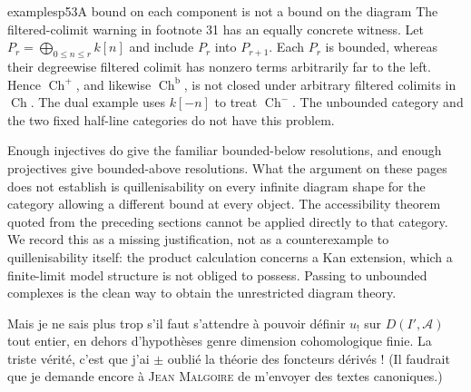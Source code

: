\begin{dcomment}{examples}{p53}{A bound on each component is not a bound on the diagram}
The filtered-colimit warning in footnote 31 has an equally concrete witness. Let $P_r=\bigoplus_{0\leq n\leq r}k[n]$ and include $P_r$ into $P_{r+1}$. Each $P_r$ is bounded, whereas their degreewise filtered colimit has nonzero terms arbitrarily far to the left. Hence $\operatorname{Ch}^+$, and likewise $\operatorname{Ch}^{\mathrm b}$, is not closed under arbitrary filtered colimits in $\operatorname{Ch}$. The dual example uses $k[-n]$ to treat $\operatorname{Ch}^-$. The unbounded category and the two fixed half-line categories do not have this problem.

Enough injectives do give the familiar bounded-below resolutions, and enough projectives give bounded-above resolutions. What the argument on these pages does not establish is quillenisability on every infinite diagram shape for the category allowing a different bound at every object. The accessibility theorem quoted from the preceding sections cannot be applied directly to that category. We record this as a missing justification, not as a counterexample to quillenisability itself: the product calculation concerns a Kan extension, which a finite-limit model structure is not obliged to possess. Passing to unbounded complexes is the clean way to obtain the unrestricted diagram theory.
\end{dcomment}


Mais je ne sais plus trop s'il faut s'attendre à pouvoir définir $u_{!}$ sur $D(I',\mathcal{A})$ tout entier, en dehors d'hypothèses genre dimension cohomologique finie. La triste vérité, c'est que j'ai $\pm$ oublié la théorie des foncteurs dérivés ! (Il faudrait que je demande encore à \textsc{Jean Malgoire} de m'envoyer des textes canoniques.)

